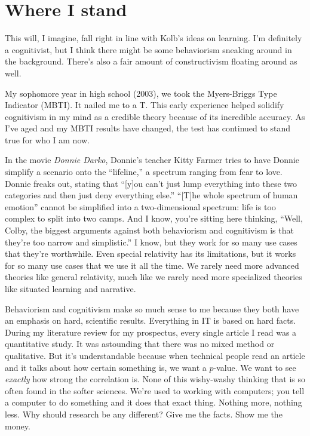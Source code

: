\documentclass[man,natbib]{apa6}
\begin{document}
\section{Where I stand}
This will, I imagine, fall right in line with Kolb's ideas on learning. I'm definitely a cognitivist, but I think there might be some behaviorism sneaking around in the background. There's also a fair amount of constructivism floating around as well.

My sophomore year in high school (2003), we took the Myers-Briggs Type Indicator (MBTI). It nailed me to a T. This early experience helped solidify cognitivism in my mind as a credible theory because of its incredible accuracy. As I've aged and my MBTI results have changed, the test has continued to stand true for who I am now.

In the movie \textit{Donnie Darko}, Donnie's teacher Kitty Farmer tries to have Donnie simplify a scenario onto the ``lifeline,'' a spectrum ranging from fear to love. Donnie freaks out, stating that ``[y]ou can't just lump everything into these two categories and then just deny everything else.'' ``[T]he whole spectrum of human emotion'' cannot be simplified into a two-dimensional spectrum: life is too complex to split into two camps.
And I know, you're sitting here thinking, ``Well, Colby, the biggest arguments against both behaviorism and cognitivism is that they're too narrow and simplistic.'' I know, but they work for so many use cases that they're worthwhile. Even special relativity has its limitations, but it works for so many use cases that we use it all the time. We rarely need more advanced theories like general relativity, much like we rarely need more specialized theories like situated learning and narrative.

Behaviorism and cognitivism make so much sense to me because they both have an emphasis on hard, scientific results. Everything in IT is based on hard facts.
During my literature review for my prospectus, every single article I read was a quantitative study. It was astounding that there was no mixed method or qualitative. But it's understandable because when technical people read an article and it talks about how certain something is, we want a $p$-value. We want to see \emph{exactly} how strong the correlation is. None of this wishy-washy thinking that is so often found in the softer sciences. We're used to working with computers; you tell a computer to do something and it does that exact thing. Nothing more, nothing less. Why should research be any different? Give me the facts. Show me the money.
\end{document}
